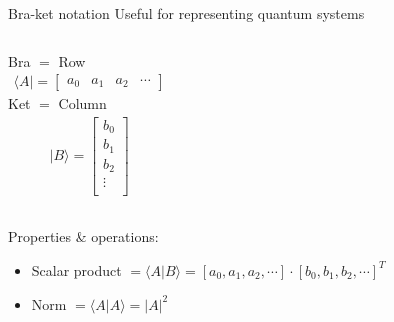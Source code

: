 \begin{frame}{Bra-ket notation}
    Useful for representing quantum systems
		\begin{columns}[T,onlytextwidth]
			\centering
			Bra $=$ Row
			\begin{align*}
			    \langle A\rvert
			     = 
                \begin{bmatrix}
                a_{0} & a_{1} & a_{2} & \cdots
                \end{bmatrix}
            \end{align*}
			\centering
			Ket $=$ Column
            \begin{align*}
			    \lvert B\rangle
			     = 
                \begin{bmatrix}
                b_{0} \\
                b_{1} \\
                b_{2} \\
                \vdots \\
                \end{bmatrix}
            \end{align*}
		\end{columns}
		Properties & operations:
		\begin{itemize}
			\item Scalar product $= \langle A\lvert B \rangle = [a_{0}, a_{1}, a_{2}, \cdots] \cdot [b_{0}, b_{1}, b_{2}, \cdots]^T$ 
			\item Norm $= \langle A\lvert A \rangle = |A|^2$
		\end{itemize}
    
\end{frame}

